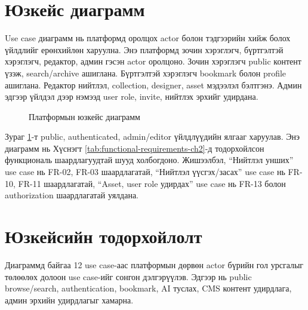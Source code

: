 \section{Юзкейс диаграмм}
Use case диаграмм нь платформд оролцох actor болон тэдгээрийн хийж болох үйлдлийг ерөнхийлөн харуулна. Энэ платформд зочин хэрэглэгч, бүртгэлтэй хэрэглэгч, редактор, админ гэсэн actor оролцоно. Зочин хэрэглэгч public контент үзэж, search/archive ашиглана. Бүртгэлтэй хэрэглэгч bookmark болон profile ашиглана. Редактор нийтлэл, collection, designer, asset мэдээлэл бэлтгэнэ. Админ эдгээр үйлдэл дээр нэмээд user role, invite, нийтлэх эрхийг удирдана.

\begin{figure}[htbp]
  \centering
  \resizebox{0.96\textwidth}{!}{}
  \caption[Платформын юзкейс диаграмм]{Платформын юзкейс диаграмм}
  \label{fig:ch2-usecase-diagram}
\end{figure}

Зураг \ref{fig:ch2-usecase-diagram}-т public, authenticated, admin/editor үйлдлүүдийн ялгааг харуулав. Энэ диаграмм нь Хүснэгт \ref{tab:functional-requirements-ch2}-д тодорхойлсон функциональ шаардлагуудтай шууд холбогдоно. Жишээлбэл, ``Нийтлэл унших'' use case нь FR-02, FR-03 шаардлагатай, ``Нийтлэл үүсгэх/засах'' use case нь FR-10, FR-11 шаардлагатай, ``Asset, user role удирдах'' use case нь FR-13 болон authorization шаардлагатай уялдана.

\section{Юзкейсийн тодорхойлолт}
Диаграммд байгаа 12 use case-аас платформын дөрвөн actor бүрийн гол урсгалыг төлөөлөх долоон use case-ийг сонгон дэлгэрүүлэв. Эдгээр нь public browse/search, authentication, bookmark, AI туслах, CMS контент удирдлага, админ эрхийн удирдлагыг хамарна.

